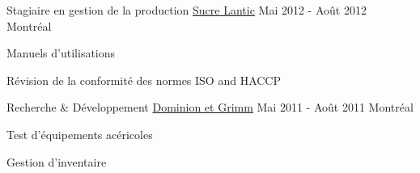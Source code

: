 \begin{cventries}
  \cventry
    {Stagiaire en gestion de la production} %
    {\href{https://www.lanticrogers.com/fr/}{Sucre Lantic}} %
    {Mai 2012 - Août 2012} %
    {Montréal} %
    {
      \begin{cvitems} %
        \item {Manuels d'utilisations}
        \item {Révision de la conformité des normes ISO and HACCP}
      \end{cvitems}
    }

\end{cventries}

\newpage
{}


\begin{cventries}

  \cventry
  {Recherche \& Développement} %
  {\href{https://www.dominiongrimm.ca/fr/accueil.html}{Dominion et Grimm}} %
    {Mai 2011 - Août 2011} %
    {Montréal} %
    {
      \begin{cvitems} %
        \item {Test d'équipements acéricoles}
        \item {Gestion d'inventaire}
      \end{cvitems}
    }

\end{cventries}
